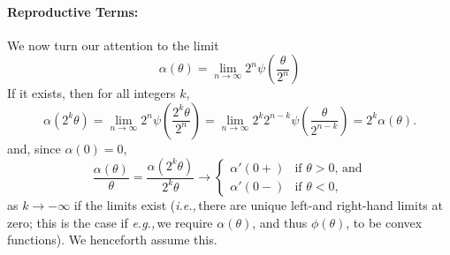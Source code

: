 \documentclass{article}
\newcommand{\ie}{\textit{i.e.,}\,}
\newcommand{\eg}{\textit{e.g.,}\,}
\newcommand{\1}{\mathbbm{1}}
\theoremstyle{remark}
\theoremstyle{definition}
\begin{document}
\paragraph{Reproductive Terms:}
We now turn our attention to the limit
\[
		\alpha(\theta) = \lim_{n \to \infty} 2^{n}\psi\left(\frac{\theta}{2^{n}}\right)
\]
If it exists, then for all integers $k$, 
\[
	\alpha(2^{k} \theta) = \lim_{n \to \infty} 2^{n}\psi\left(\frac{2^{k} \theta}{2^{n}}\right) =  \lim_{n \to \infty} 2^{k} 2^{n-k} \psi\left(\frac{\theta}{2^{n-k}}\right) = 2^{k} \alpha(\theta).
\]
and, since $\alpha(0) = 0$,
\[
	\frac{\alpha(\theta)}{\theta} = \frac{\alpha(2^{k} \theta)}{2^{k}\theta} 
	\to \begin{cases} 
		\alpha'(0+) & \text{if $\theta > 0$, and}\\
		\alpha'(0-) & \text{if $\theta < 0$,}
	\end{cases}
\]
as $k \to - \infty$ if the limits exist (\ie there are unique left-and right-hand limits at zero; this is the case if \eg we require $\alpha(\theta)$, and thus $\phi(\theta)$, to be convex functions).  We henceforth assume this.
\end{document}
